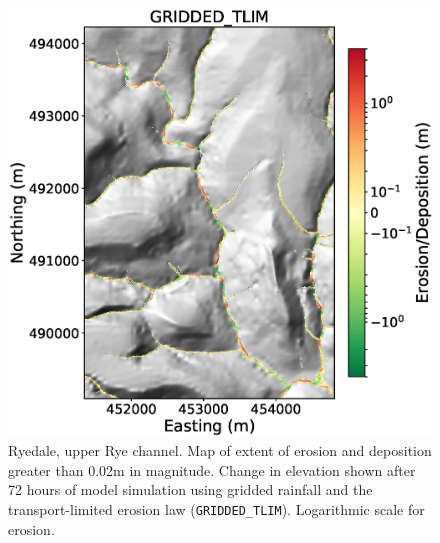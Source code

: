 \begin{figure}[htb]
\includegraphics[width=16cm]{chp06_figures_scripts/figure_ryedale_elev_diff_grid_tlim_UPPER.eps}
\caption{Ryedale, upper Rye channel. Map of extent of erosion and deposition greater than 0.02m in magnitude. Change in elevation shown after 72 hours of model simulation using gridded rainfall and the transport-limited erosion law (\texttt{GRIDDED\_TLIM}). Logarithmic scale for erosion.}
\label{fig_ryedale_erodediff_UPPER_gridded_tlim}
\end{figure}

